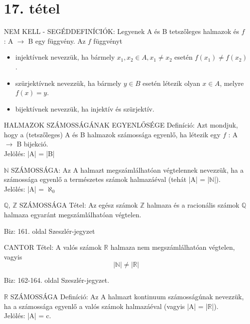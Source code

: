 \section{17. tétel}

\begin{shaded}
NEM KELL - SEGÉDDEFINÍCIÓK: Legyenek A és B tetszőleges halmazok és $f$ : A $\to$ B egy függvény. Az $f$ függvényt
\begin{itemize}
\item injektívnek nevezzük, ha bármely $x_1, x_2 \in A, x_1 \neq x_2$ esetén $f(x_1) \neq f(x_2)$.
\item szürjektívnek nevezzük, ha bármely $y \in B$ esetén létezik olyan $x \in A$, melyre $f(x) = y$.
\item bijektívnek nevezzük, ha injektív és szürjektív.
\end{itemize}
\end{shaded}
\begin{shaded}
HALMAZOK SZÁMOSSÁGÁNAK EGYENLŐSÉGE Definíció: Azt mondjuk, hogy a (tetszőleges) A és B halmazok számossága egyenlő, ha létezik egy $f$ : A $\to$ B bijekció.\\
Jelölés: |A| = |B|
\end{shaded}
\begin{shaded}
$\mathbb{N}$ SZÁMOSSÁGA: Az A halmazt megszámlálhatóan végtelennek nevezzük, ha a számossága egyenlő a természetes számok halmazáéval (tehát |A| = |$\mathbb{N}$|).\\
Jelölés: |A| = $\aleph_0$
\end{shaded}
\begin{framed}
$\mathbb{Q}$, $\mathbb{Z}$ SZÁMOSSÁGA Tétel: Az egész számok $\mathbb{Z}$ halmaza és a racionális számok $\mathbb{Q}$ halmaza egyaránt megszámlálhatóan végtelen.
\end{framed}
\begin{leftbar}
Biz: 161. oldal Szeszlér-jegyzet
\end{leftbar}
\begin{framed}
CANTOR Tétel: A valós számok $\mathbb{R}$ halmaza nem megszámlálhatóan végtelen, vagyis $$|\mathbb{N}| \neq |\mathbb{R}|$$
\end{framed}
\begin{leftbar}
Biz: 162-164. oldal Szeszlér-jegyzet.
\end{leftbar}
\begin{shaded}
$\mathbb{R}$ SZÁMOSSÁGA Definíció: Az A halmazt kontinuum számosságúnak nevezzük, ha a számossága egyenlő a valós számok halmazáéval (vagyis |A| = |$\mathbb{R}$|).\\
Jelölés: |A| = c.
\end{shaded}

